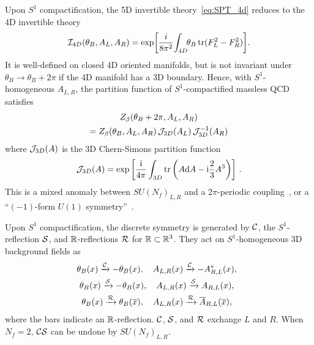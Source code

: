 \documentclass[
 reprint,







nofootinbib,


 amsmath,amssymb,
 aps,
 prd






tightenlines
]{revtex4-2}
\begin{document}
Upon $S^1$ compactification, the 5D invertible theory~\eqref{eq:SPT_4d}
reduces to the 4D invertible theory
\begin{align}\label{eq:SPT_3D}
    \mathcal{I}_{4D}(\theta_B,A_L,A_R) =
    \exp\!\left[\frac{i}{8\pi^2}\! \int_{4D}\!\! \theta_B \,\mathrm{tr} (F_L^2 -F_R^2)\right]\!.
\end{align}
It is well-defined on closed 4D oriented manifolds, but is not
invariant under $\theta_B\to\theta_B+2\pi$ if the 4D manifold has a 3D
boundary. Hence, with $S^1$-homogeneous $A_{L,R}$, the partition
function of $S^1$-compactified massless QCD
satisfies~\cite{Yonekura:2019vyz,Nishimura:2019umw,Kobayashi:2023ajk}
\begin{align}\label{eq:anomaly_3D}
\begin{gathered}
    Z_{\beta}(\theta_B + 2\pi, A_L, A_R) \\
    = Z_{\beta}(\theta_B, A_L, A_R) \,\mathcal{J}_{3D}(A_L) \,\mathcal{J}_{3D}^{-1}(A_R)
\end{gathered}
\end{align}
where $\mathcal{J}_{3D}(A)$ is the 3D Chern-Simons partition function
\begin{align}
    \mathcal{J}_{3D}(A) =  \exp\left[\frac{\mathrm{i}}{4\pi}\int_{3D}
    \mathrm{tr}\left( A \mathrm{d} A - \mathrm{i}\frac{2}{3} A^3 \right)\right] \,.
\end{align}
This is a mixed anomaly between $SU(N_f)_{L,R}$ and a $2\pi$-periodic coupling~\cite{Kikuchi:2017pcp,Cordova:2019jnf,Cordova:2019uob,Heidenreich:2021xpr,Garcia-Valdecasas:2024cqn,Yu:2024jtk}, or a ``$(-1)$-form $U(1)$ symmetry''~\cite{Najjar:2024vmm,Aloni:2024jpb, Lin:2025oml,Robbins:2025urk}.

Upon $S^1$ compactification, the discrete symmetry is generated by $\mathcal{C}$, the $S^1$-reflection $\mathcal{S}$, and $\mathbb{R}$-reflections $\mathcal{R}$ for $\mathbb{R}\subset\mathbb{R}^3$.
They act on $S^1$-homogeneous 3D background fields as
\begin{equation}
\!\!\!\!\begin{gathered}
    \theta_B(x) \xrightarrow{\mathcal{C}} -\theta_B(x),\quad A_{L,R}(x) \xrightarrow{\mathcal{C}} -A_{R,L}^*(x),\\
    \theta_B(x) \xrightarrow{\mathcal{S}} -\theta_B(x),\quad A_{L,R}(x) \xrightarrow{\mathcal{S}} A_{R,L}(x),\\
    \theta_B(x) \xrightarrow{\mathcal{R}}\theta_B(\overline{x}),\quad A_{L,R}(x) \xrightarrow{\mathcal{R}} \overline{A}_{R,L}(\overline{x}),
\end{gathered}
\end{equation}
where the bars indicate an $\mathbb{R}$-reflection.
$\mathcal{C}$, $\mathcal{S}$, and $\mathcal{R}$ exchange $L$ and $R$.
When $N_f=2$, $\mathcal{C}\mathcal{S}$ can be undone by $SU(N_f)_{L,R}$.
\end{document}
